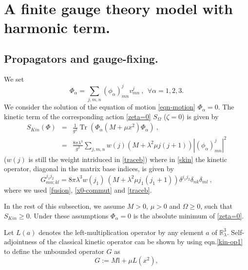 \documentclass[a4paper,11pt,twoside]{article}
\numberwithin{equation}{section}
\newcommand\bbone{{ \mathbb{I}}}
\DeclareMathOperator{\tr}{Tr}
\theoremstyle{nonumberplain}
\newcounter{and}
\begin{document}

\section{A finite gauge theory model with harmonic term.}\label{section3}

\subsection{Propagators and gauge-fixing.}\label{subsection31}

We set%
%
\begin{equation}
\Phi_\alpha = \sum_{j,m,n} (\phi_\alpha)^j_{mn} v^j_{mn} \ , \ \ \forall \alpha=1,2,3.
\end{equation}
%
We consider the solution of the equation of motion \eqref{eqn-motion} $\Phi_\alpha=0$. The kinetic term of the corresponding action \eqref{zeta=0} $S_\Omega$ ($\zeta=0$) is given by%
%
\begin{eqnarray}
S_{Kin}(\Phi) &=& \frac{1}{g^2} \tr\left( \Phi_\alpha \left(M+\mu x^2\right) \Phi_\alpha \right) \ , \label{skin} \\
&=& \frac{8\pi\lambda^3}{g^2} \sum_{j,m,n} w(j) \left(M+\lambda^2\mu j(j+1)\right) |(\phi_\alpha)^j_{mn}|^2 \label{skin-explicit}
\end{eqnarray}
%
($w(j)$ is still the weight intriduced in \eqref{traceb}) where in \eqref{skin} the kinetic operator, diagonal in the matrix base indices, is given by%
%
\begin{equation}
G^{j_1j_2}_{mn;kl} = 8\pi\lambda^3 w(j_1) \ \left(M+\lambda^2\mu j_1(j_1+1)\right) \delta^{j_1j_2} \delta_{nk} \delta_{ml} \ , \label{kin-op1}
\end{equation}
%
where we used \eqref{fusion}, \eqref{x0-commut} and \eqref{traceb}.\par%
%
In the rest of this subsection, we assume $M>0$, $\mu>0$ and $\Omega\ge0$, such that $S_{Kin}\ge0$. Under these assumptions $\Phi_\alpha=0$ is the absolute minimum of \eqref{zeta=0}.\par%
%
Let $L(a)$ denotes the left-multiplication operator by any element $a$ of $\mathbb{R}^3_\lambda$. Self-adjointness of the classical kinetic operator can be shown by using eqn.\eqref{kin-op1} to define the unbounded operator $G$ as%
%
\begin{equation}
G:= M \bbone + \mu L(x^2) \label{kinet-harmonic},
\end{equation}
\end{document}
